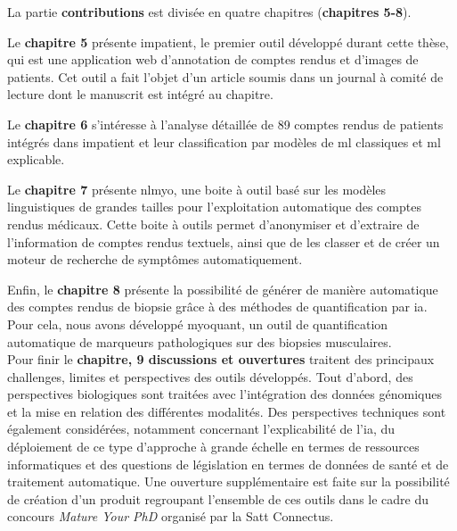 La partie \textbf{contributions} est divisée en quatre chapitres (\textbf{chapitres 5-8}). 

Le \textbf{chapitre 5} présente \gls{impatient}, le premier outil développé durant cette thèse, qui est une application web d'annotation de comptes rendus et d'images de patients. Cet outil a fait l'objet d'un article soumis dans un journal à comité de lecture dont le manuscrit est intégré au chapitre. 

Le \textbf{chapitre 6} s'intéresse à l'analyse détaillée de 89 comptes rendus de patients intégrés dans \gls{impatient} et leur classification par modèles de \gls{ml} classiques et \gls{ml} explicable.

Le \textbf{chapitre 7} présente \gls{nlmyo}, une boite à outil basé sur les modèles linguistiques de grandes tailles pour l'exploitation automatique des comptes rendus médicaux. Cette boite à outils permet d'anonymiser et d'extraire de l'information de comptes rendus textuels, ainsi que de les classer et de créer un moteur de recherche de symptômes automatiquement. 

Enfin, le \textbf{chapitre 8} présente la possibilité de générer de manière automatique des comptes rendus de biopsie grâce à des méthodes de quantification par \gls{ia}. Pour cela, nous avons développé \gls{myoquant}, un outil de quantification automatique de marqueurs pathologiques sur des biopsies musculaires. \\


Pour finir le \textbf{chapitre, 9 discussions et ouvertures} traitent des principaux challenges, limites et perspectives des outils développés. Tout d'abord, des perspectives biologiques sont traitées avec l'intégration des données génomiques et la mise en relation des différentes modalités. Des perspectives techniques sont également considérées, notamment concernant l'explicabilité de l'\gls{ia}, du déploiement de ce type d'approche à grande échelle en termes de ressources informatiques et des questions de législation en termes de données de santé et de traitement automatique. Une ouverture supplémentaire est faite sur la possibilité de création d'un produit regroupant l'ensemble de ces outils dans le cadre du concours \textit{Mature Your PhD} organisé par la Satt Connectus.